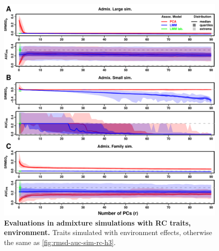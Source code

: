 \documentclass[11pt]{article}
\begin{document}
\begin{figure}[hp!]
  \centering
  \includegraphics[width=\textwidth,height=\textheight,keepaspectratio]{m_causal_fac-27/h0.3/env0.3-0.2/rmsd-auc-sim.pdf}
  \caption{
    {\bf Evaluations in admixture simulations with RC traits, environment.}
    Traits simulated with environment effects, otherwise the same as \cref{fig:rmsd-auc-sim-rc-h3}.
  }
  \label{fig:rmsd-auc-sim-rc-env}
\end{figure}
\end{document}
